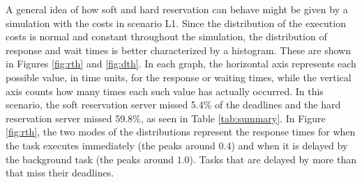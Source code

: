 \documentclass[12pt]{article}
\begin{document}
A general idea of how soft and hard reservation can behave might be
given by a simulation with the costs in scenario L1. Since the
distribution of the execution costs is normal and constant throughout
the simulation, the distribution of response and wait times is better
characterized by a histogram. These are shown in Figures \ref{fig:rth}
and \ref{fig:dth}. In each graph, the horizontal axis represents each
possible value, in time units, for the response or waiting times,
while the vertical axis counts how many times each such value has
actually occurred. In this scenario, the soft reservation server
missed 5.4\% of the deadlines and the hard reservation server missed
59.8\%, as seen in Table \ref{tab:summary}. In Figure \ref{fig:rth},
the two modes of the distributions represent the response times for
when the task executes immediately (the peaks around $0.4$) and when
it is delayed by the background task (the peaks around $1.0$). Tasks
that are delayed by more than that miss their deadlines.
\end{document}
